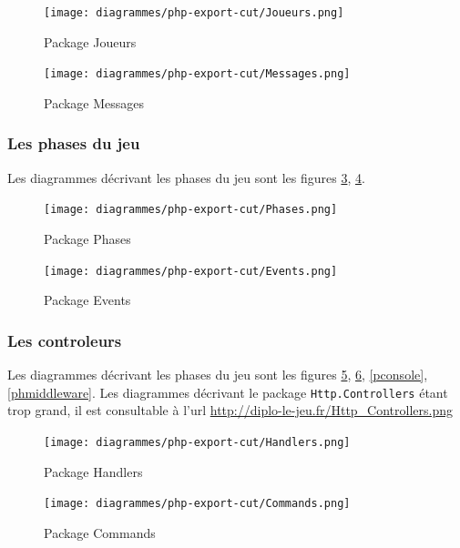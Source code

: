 			\begin{figure}[!h]
				\centering
                \texttt{[image: diagrammes/php-export-cut/Joueurs.png]}
                \caption{\label{pjoueurs}Package Joueurs}
			\end{figure}

			\begin{figure}[h!]
				\centering
                \texttt{[image: diagrammes/php-export-cut/Messages.png]}
                \caption{\label{pmessages}Package Messages}
                \pagebreak
			\end{figure} 

        \newpage
        \subsubsection{Les phases du jeu}
        Les diagrammes décrivant les phases du jeu sont les figures \ref{pphases}, \ref{pevents}.

			\begin{figure}[!h]
				\centering
                \texttt{[image: diagrammes/php-export-cut/Phases.png]}
                \caption{\label{pphases}Package Phases}
			\end{figure}

			\begin{figure}[!h]
				\centering
                \texttt{[image: diagrammes/php-export-cut/Events.png]}
                \caption{\label{pevents}Package Events}
			\end{figure}
        
        \newpage
        \subsubsection{Les controleurs}
        Les diagrammes décrivant les phases du jeu sont les figures \ref{phandlers}, \ref{pcommands}, \ref{pconsole}, \ref{phmiddleware}.
        Les diagrammes décrivant le package \verb|Http.Controllers| étant trop grand, il est consultable à l'url \url{http://diplo-le-jeu.fr/Http\_Controllers.png}

			\begin{figure}[!h]
				\centering
                \texttt{[image: diagrammes/php-export-cut/Handlers.png]}
                \caption{\label{phandlers}Package Handlers}
			\end{figure}

			\begin{figure}[!h]
				\centering
                \texttt{[image: diagrammes/php-export-cut/Commands.png]}
                \caption{\label{pcommands}Package Commands}
			\end{figure}

